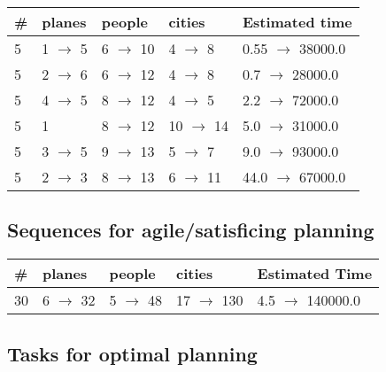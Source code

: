\documentclass{article}
\begin{document}
                            \begin{center}
                            \begin{tabular}{@{}l|l|l|l|l@{}}
                            \# & planes & people & cities & Estimated time\\\midrule
                            5&1 $\rightarrow$ 5&6 $\rightarrow$ 10&4 $\rightarrow$ 8&0.55 $\rightarrow$ 38000.0\\
5&2 $\rightarrow$ 6&6 $\rightarrow$ 12&4 $\rightarrow$ 8&0.7 $\rightarrow$ 28000.0\\
5&4 $\rightarrow$ 5&8 $\rightarrow$ 12&4 $\rightarrow$ 5&2.2 $\rightarrow$ 72000.0\\
5&1&8 $\rightarrow$ 12&10 $\rightarrow$ 14&5.0 $\rightarrow$ 31000.0\\
5&3 $\rightarrow$ 5&9 $\rightarrow$ 13&5 $\rightarrow$ 7&9.0 $\rightarrow$ 93000.0\\
5&2 $\rightarrow$ 3&8 $\rightarrow$ 13&6 $\rightarrow$ 11&44.0 $\rightarrow$ 67000.0
                            \end{tabular}
                            \end{center}
                    
                         \subsection*{Sequences for agile/satisficing planning}

                        \begin{center}
                        \begin{tabular}{@{}l|l|l|l|l@{}}
                        \# & planes & people & cities & Estimated Time\\\midrule
                        30&6 $\rightarrow$ 32&5 $\rightarrow$ 48&17 $\rightarrow$ 130&4.5 $\rightarrow$ 140000.0
                        \end{tabular}
                        \end{center}
                    
                                \subsection*{Tasks for optimal planning}
                                
\end{document}
